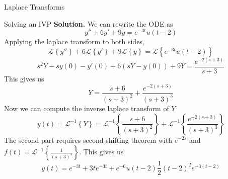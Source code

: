 \documentclass{article}
\newcommand{\laplace}[1]{\mathcal{L}\left\{#1\right\}}
\newcommand{\ilaplace}[1]{\mathcal{L}^{-1}\left\{#1\right\}}
\begin{document}
\begin{multicols*}{3}
\begin{blackbox}{Laplace Transforms}
\begin{brownbox}{Solving an IVP}
{                \noindent
                \textbf{Solution.} We can rewrite the ODE as \\[-2ex]
                \[y'' + 6y' + 9y = e^{-3t}u(t-2)\]
                Applying the laplace transform to both sides,\\[-2ex] 
                \[\laplace{y''} + 6\laplace{y'} + 9\laplace{y} = \laplace{e^{-3t}u(t-2)}\]
                \vspace{-3.5ex}
                \[s^2Y - sy(0) - y'(0) + 6(sY - y(0)) + 9Y= \frac{e^{-2(s+3)}}{s+3}\]
                This gives us \\[-4ex]
                \[Y = \frac{s+6}{(s+3)^2} + \frac{e^{-2(s+3)}}{(s+3)^3}\]
                Now we can compute the inverse laplace transform of $Y$\\[-2ex]
                \[y(t) = \ilaplace{Y} = \ilaplace{\frac{s+6}{(s+3)^2}} + \ilaplace{\frac{e^{-2(s+3)}}{(s+3)^3}}\]
               The second part requires second shifting theorem with $e^{-2s}$ and $f(t) = \ilaplace{\frac{1}{(s+3)^3}}$. This gives us \\[-2ex]
               \[y(t) = e^{-3t} + 3te^{-3t} + e^{-6}u(t-2)\frac{1}{2}(t-2)^2e^{-3(t-2)}\]
               \vspace{-4ex}
                }
                \end{brownbox}\\[-2ex]
            \end{blackbox}
    \end{multicols*}
\end{document}
